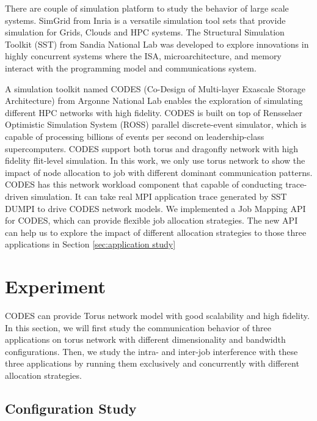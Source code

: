 \documentclass[conference]{IEEEtran}
\begin{document}
There are couple of simulation platform to study the behavior of large scale systems. SimGrid from Inria is a versatile simulation tool sets that provide simulation for Grids, Clouds and HPC systems\cite{simgrid}. The Structural Simulation Toolkit (SST) from Sandia National Lab was developed to explore innovations in highly concurrent systems where the ISA, microarchitecture, and memory interact with the programming model and communications system\cite{sst}.

A simulation toolkit named CODES (Co-Design of Multi-layer Exascale Storage Architecture) from Argonne National Lab enables the exploration of simulating different HPC networks with high fidelity\cite{Jason-2011}\cite{mubarak-sc2012}. CODES is built on top of Rensselaer Optimistic Simulation System (ROSS) parallel discrete-event simulator, which is capable of processing billions of events per second on leadership-class supercomputers\cite{ross}. CODES support both torus and dragonfly network with high fidelity flit-level simulation. In this work, we only use torus network to show the impact of node allocation to job with different dominant communication patterns. CODES has this network workload component that capable of conducting trace-driven simulation. It can take real MPI application trace generated by SST DUMPI\cite{sst} to drive CODES network models. We implemented a Job Mapping API for CODES, which can provide flexible job allocation strategies. The new API can help us to explore the impact of different allocation strategies to those three applications in Section \ref{sec:application study}


\section{Experiment}
\label{sec:experiment results}

CODES can provide Torus network model with good scalability and high fidelity\cite{codes-torus}. In this section, we will first study the communication behavior of three applications on torus network with different dimensionality and bandwidth configurations. Then, we study the intra- and inter-job interference with these three applications by running them exclusively and concurrently with different allocation strategies. 

\subsection{Configuration Study }
\label{sec: config study}
\end{document}

